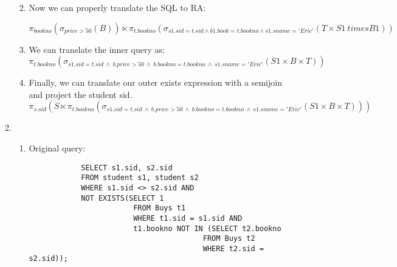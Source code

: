 \documentclass{article}
\begin{document}
\begin{enumerate}
\begin{enumerate}
\begin{enumerate}
\begin{lstlisting}
            \end{lstlisting}

            \item Now we can properly translate the SQL to RA:

            \begin{displaymath}

                \pi_{bookno}(\sigma_{price > 50}(B)) \ltimes
                \pi_{t.bookno}(\sigma_{s1.sid=t.sid \wedge b1.book=t.bookno \wedge s1.sname='Eric'}(T \times S1 \ times B1)) %
            \end{displaymath}


            \item We can translate the inner query as:
            \begin{displaymath}
                \pi_{t.bookno}(\sigma_{s1.sid=t.sid\ \wedge\ b.price > 50\ \wedge\ b.bookno = t.bookno\ \wedge\ s1.sname='Eric'}(S1 \times B \times T))
            \end{displaymath}

            \item Finally, we can translate our outer exists expression with a semijoin and project the student sid.
            \begin{displaymath}
                \pi_{s.sid}(S \ltimes
                \pi_{t.bookno}(\sigma_{s1.sid=t.sid\ \wedge\ b.price > 50\ \wedge\ b.bookno = t.bookno\ \wedge\ s1.sname='Eric'}(S1 \times B \times T)))
            \end{displaymath}

        \end{enumerate}

        \newpage

        \item %
        \begin{enumerate}

            \item Original query:
            \begin{lstlisting}
            SELECT s1.sid, s2.sid
            FROM student s1, student s2
            WHERE s1.sid <> s2.sid AND
            NOT EXISTS(SELECT 1
                        FROM Buys t1
                        WHERE t1.sid = s1.sid AND
                        t1.bookno NOT IN (SELECT t2.bookno
                                        FROM Buys t2
                                        WHERE t2.sid = s2.sid));
            \end{lstlisting}


\end{enumerate}
\end{enumerate}
\end{enumerate}
\end{document}
